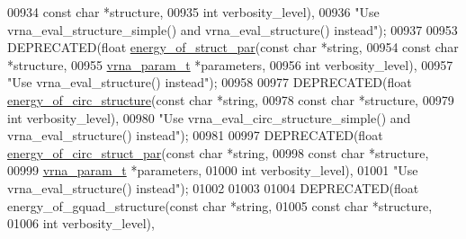 \begin{DoxyCode}
00934                                      \textcolor{keyword}{const} \textcolor{keywordtype}{char} *structure,
00935                                      \textcolor{keywordtype}{int}        verbosity\_level),
00936            \textcolor{stringliteral}{"Use vrna\_eval\_structure\_simple() and vrna\_eval\_structure() instead"});
00937 
00953 DEPRECATED(\textcolor{keywordtype}{float} \hyperlink{group__eval_gaf9d064d3c496de42eca6734a96fd2090}{energy\_of\_struct\_par}(\textcolor{keyword}{const} \textcolor{keywordtype}{char}    *\textcolor{keywordtype}{string},
00954                                       \textcolor{keyword}{const} \textcolor{keywordtype}{char}    *structure,
00955                                       \hyperlink{group__energy__parameters_structvrna__param__s}{vrna\_param\_t}  *parameters,
00956                                       \textcolor{keywordtype}{int}           verbosity\_level),
00957            \textcolor{stringliteral}{"Use vrna\_eval\_structure() instead"});
00958 
00977 DEPRECATED(\textcolor{keywordtype}{float} \hyperlink{group__eval_gaeb14f3664aec67fc03268ac75253f0f8}{energy\_of\_circ\_structure}(\textcolor{keyword}{const} \textcolor{keywordtype}{char}  *\textcolor{keywordtype}{string},
00978                                           \textcolor{keyword}{const} \textcolor{keywordtype}{char}  *structure,
00979                                           \textcolor{keywordtype}{int}         verbosity\_level),
00980            \textcolor{stringliteral}{"Use vrna\_eval\_circ\_structure\_simple() and vrna\_eval\_structure() instead"});
00981 
00997 DEPRECATED(\textcolor{keywordtype}{float} \hyperlink{group__eval_ga3f01f9744ba6a40555eb4d81fc77f6df}{energy\_of\_circ\_struct\_par}(\textcolor{keyword}{const} \textcolor{keywordtype}{char}   *\textcolor{keywordtype}{string},
00998                                            \textcolor{keyword}{const} \textcolor{keywordtype}{char}   *structure,
00999                                            \hyperlink{group__energy__parameters_structvrna__param__s}{vrna\_param\_t} *parameters,
01000                                            \textcolor{keywordtype}{int}          verbosity\_level),
01001            \textcolor{stringliteral}{"Use vrna\_eval\_structure() instead"});
01002 
01003 
01004 DEPRECATED(\textcolor{keywordtype}{float} energy\_of\_gquad\_structure(\textcolor{keyword}{const} \textcolor{keywordtype}{char} *\textcolor{keywordtype}{string},
01005                                            \textcolor{keyword}{const} \textcolor{keywordtype}{char} *structure,
01006                                            \textcolor{keywordtype}{int}        verbosity\_level),

\end{DoxyCode}
